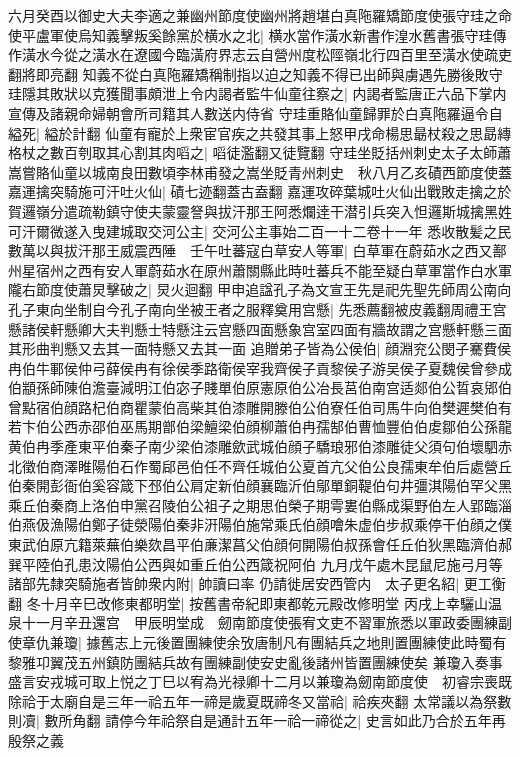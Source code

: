 六月癸酉以御史大夫李適之兼幽州節度使幽州將趙堪白真陁羅矯節度使張守珪之命使平盧軍使烏知義擊叛奚餘黨於横水之北|{
	横水當作潢水新書作湟水舊書張守珪傳作潢水今從之潢水在遼國今臨潢府界志云自營州度松陘嶺北行四百里至潢水使疏吏翻將即亮翻}
知義不從白真陁羅矯稱制指以迫之知義不得已出師與虜遇先勝後敗守珪隱其敗狀以克獲聞事頗泄上令内謁者監牛仙童往察之|{
	内謁者監唐正六品下掌内宣傳及諸親命婦朝會所司籍其人數送内侍省}
守珪重賂仙童歸罪於白真陁羅逼令自縊死|{
	縊於計翻}
仙童有寵於上衆宦官疾之共發其事上怒甲戌命楊思朂杖殺之思勗縳格杖之數百刳取其心割其肉㗖之|{
	㗖徒濫翻又徒覽翻}
守珪坐貶括州刺史太子太師蕭嵩嘗賂仙童以城南良田數頃李林甫發之嵩坐貶青州刺史　秋八月乙亥磧西節度使蓋嘉運擒突騎施可汗吐火仙|{
	磧七迹翻蓋古盍翻}
嘉運攻碎葉城吐火仙出戰敗走擒之於賀邏嶺分遣疏勒鎮守使夫蒙靈詧與拔汗那王阿悉爛逹干潜引兵突入怛邏斯城擒黑姓可汗爾微遂入曳建城取交河公主|{
	交河公主事始二百一十二卷十一年}
悉收散髪之民數萬以與拔汗那王威震西陲　壬午吐蕃寇白草安人等軍|{
	白草軍在蔚茹水之西又鄯州星宿州之西有安人軍蔚茹水在原州蕭關縣此時吐蕃兵不能至疑白草軍當作白水軍}
隴右節度使蕭炅擊破之|{
	炅火迴翻}
甲申追諡孔子為文宣王先是祀先聖先師周公南向孔子東向坐制自今孔子南向坐被王者之服釋奠用宫懸|{
	先悉薦翻被皮義翻周禮王宫懸諸侯軒懸卿大夫判懸士特懸注云宫懸四面懸象宫室四面有牆故謂之宫懸軒懸三面其形曲判懸又去其一面特懸又去其一面}
追贈弟子皆為公侯伯|{
	顔淵兖公閔子騫費侯冉伯牛鄆侯仲弓薛侯冉有徐侯季路衛侯宰我齊侯子貢黎侯子游吴侯子夏魏侯曾參成伯顓孫師陳伯澹臺減明江伯宓子賤單伯原憲原伯公冶長莒伯南宫适郯伯公晢哀郳伯曾點宿伯顔路杞伯商瞿蒙伯高柴其伯漆雕開滕伯公伯寮任伯司馬牛向伯樊遲樊伯有若卞伯公西赤邵伯巫馬期鄫伯梁鱣梁伯顔柳蕭伯冉孺郜伯曹恤豐伯伯䖍鄒伯公孫龍黄伯冉季產東平伯秦子南少梁伯漆雕歛武城伯顔子驕琅邪伯漆雕徒父須句伯壞駟赤北徵伯商澤睢陽伯石作蜀郈邑伯任不齊任城伯公夏首亢父伯公良孺東牟伯后處營丘伯秦開彭衙伯奚容箴下邳伯公肩定新伯顔襄臨沂伯鄔單銅鞮伯句井彊淇陽伯罕父黑乘丘伯秦商上洛伯申黨召陵伯公祖子之期思伯榮子期雩婁伯縣成渠野伯左人郢臨淄伯燕伋漁陽伯鄭子徒滎陽伯秦非汧陽伯施常乘氏伯顔噲朱虚伯步叔乘停干伯顔之僕東武伯原亢籍萊蕪伯樂欬昌平伯亷潔菖父伯顔何開陽伯叔孫會任丘伯狄黑臨濟伯郝巽平陸伯孔患汶陽伯公西與如重丘伯公西箴祝阿伯}
九月戊午處木昆鼠尼施弓月等諸部先隸突騎施者皆帥衆内附|{
	帥讀曰率}
仍請徙居安西管内　太子更名紹|{
	更工衡翻}
冬十月辛巳改修東都明堂|{
	按舊書帝紀即東都乾元殿改修明堂}
丙戌上幸驪山温泉十一月辛丑還宫　甲辰明堂成　劒南節度使張宥文吏不習軍旅悉以軍政委團練副使章仇兼瓊|{
	據舊志上元後置團練使余攷唐制凡有團結兵之地則置團練使此時蜀有黎雅卭翼茂五州鎮防團結兵故有團練副使安史亂後諸州皆置團練使矣}
兼瓊入奏事盛言安戎城可取上悦之丁巳以宥為光禄卿十二月以兼瓊為劒南節度使　初睿宗喪既除祫于太廟自是三年一祫五年一禘是歲夏既禘冬又當祫|{
	祫疾夾翻}
太常議以為祭數則凟|{
	數所角翻}
請停今年祫祭自是通計五年一祫一禘從之|{
	史言如此乃合於五年再殷祭之義}


